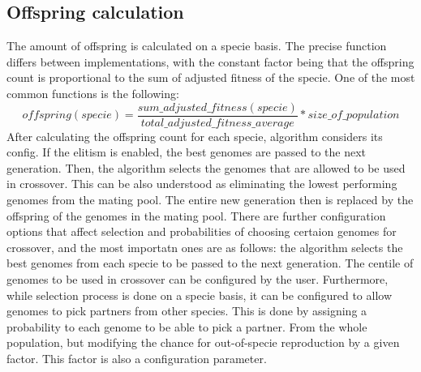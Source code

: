\documentclass{article}
\begin{document}
\subsection{Offspring calculation}
The amount of offspring is calculated on a specie basis. The precise function differs between implementations, with the constant factor being that
the offspring count is proportional to the sum of adjusted fitness of the specie. One of the most common functions is the following: 
$$offspring(specie) = \frac{sum\_adjusted\_fitness(specie)}{total\_adjusted\_fitness\_average} * size\_of\_population$$
After calculating the offspring count for each specie, algorithm considers its config. If the elitism is enabled, the best genomes are
passed to the next generation. Then, the algorithm selects the genomes that are allowed to be used in crossover. This can be also understood as
eliminating the lowest performing genomes from the mating pool. The entire new generation then is replaced by the offspring of the genomes in the mating pool.
There are further configuration options that affect selection and probabilities of choosing certaion genomes for crossover, and the most importatn
ones are as follows:
the algorithm selects the best genomes from each specie to be passed to the next generation.
The centile of genomes to be used in crossover can be configured by the user. Furthermore, while selection process is done on a specie basis, it can
be configured to allow genomes to pick partners from other species. This is done by assigning a probability to each genome to be able to pick a partner.
From the whole population, but modifying the chance for out-of-specie reproduction by a given factor. This factor is also a configuration parameter.
\end{document}
